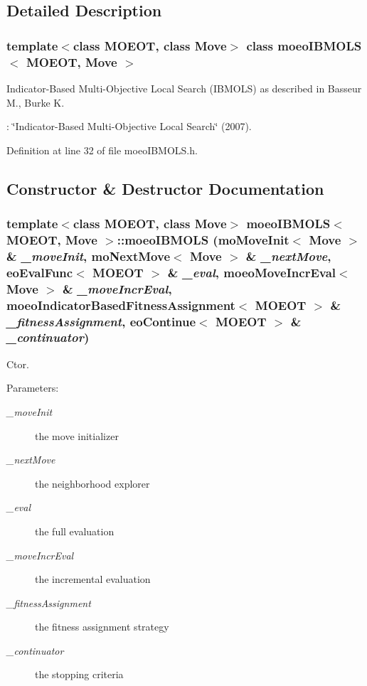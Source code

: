 \subsection{Detailed Description}
\subsubsection*{template$<$class MOEOT, class Move$>$ class moeo\-IBMOLS$<$ MOEOT, Move $>$}

Indicator-Based Multi-Objective Local Search (IBMOLS) as described in Basseur M., Burke K. 

: \char`\"{}Indicator-Based Multi-Objective Local Search\char`\"{} (2007). 



Definition at line 32 of file moeo\-IBMOLS.h.

\subsection{Constructor \& Destructor Documentation}
\subsubsection{\setlength{\rightskip}{0pt plus 5cm}template$<$class MOEOT, class Move$>$ \bf{moeo\-IBMOLS}$<$ MOEOT, Move $>$::\bf{moeo\-IBMOLS} (mo\-Move\-Init$<$ Move $>$ \& {\em \_\-move\-Init}, mo\-Next\-Move$<$ Move $>$ \& {\em \_\-next\-Move}, \bf{eo\-Eval\-Func}$<$ MOEOT $>$ \& {\em \_\-eval}, \bf{moeo\-Move\-Incr\-Eval}$<$ Move $>$ \& {\em \_\-move\-Incr\-Eval}, \bf{moeo\-Indicator\-Based\-Fitness\-Assignment}$<$ MOEOT $>$ \& {\em \_\-fitness\-Assignment}, \bf{eo\-Continue}$<$ MOEOT $>$ \& {\em \_\-continuator})\hspace{0.3cm}{\tt  [inline]}}\label{classmoeoIBMOLS_04a4c1b453fe5ba2e3d44572196161fb}


Ctor. 

\begin{Desc}
\item[Parameters:]
\begin{description}
\item[{\em \_\-move\-Init}]the move initializer \item[{\em \_\-next\-Move}]the neighborhood explorer \item[{\em \_\-eval}]the full evaluation \item[{\em \_\-move\-Incr\-Eval}]the incremental evaluation \item[{\em \_\-fitness\-Assignment}]the fitness assignment strategy \item[{\em \_\-continuator}]the stopping criteria \end{description}
\end{Desc}



